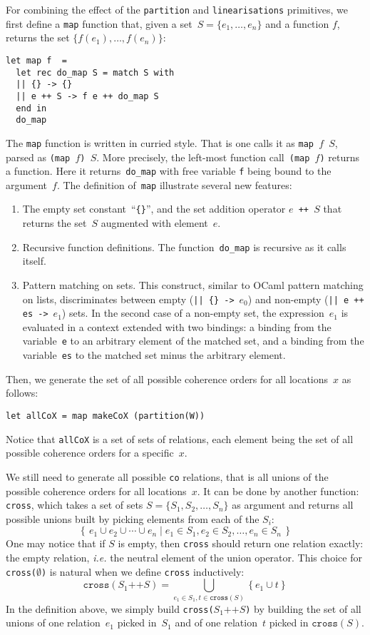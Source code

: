 For combining the effect of the \texttt{partition} and \texttt{linearisations}
primitives, we first define a \texttt{map} function that, given a set~$S=
\{e_1,\ldots,e_n\}$ and a function $f$, returns the set
$\{f(e_1),\ldots,f(e_n)\}$:
\begin{verbatim}
let map f  =
  let rec do_map S = match S with
  || {} -> {}
  || e ++ S -> f e ++ do_map S
  end in
  do_map
\end{verbatim}
The \texttt{map} function is written in curried style.
That is one calls it as \texttt{map~$f$~$S$}, parsed
as \texttt{(map~$f$)~$S$}. More precisely, the left-most function
call~\texttt{(map~$f$)} returns a function.
Here it returns~\texttt{do\_map} with free variable \texttt{f} being bound
to the argument~$f$.
The definition of~\texttt{map} illustrate several new features:
\begin{enumerate}
\item The empty set constant~``\verb+{}+'',
and the set addition operator \texttt{$e$ ++ $S$} that returns the set~$S$
augmented with element~$e$.
\item Recursive function definitions. The function~\verb+do_map+
is recursive as it calls itself.
\item Pattern matching on sets.
This construct, similar to OCaml pattern matching on lists, discriminates
between empty (\verb+|| {} ->+~$e_0$) and non-empty
(\verb!|| e ++ es ->!~$e_1$) sets.
In the second case of a non-empty set, the expression~$e_1$ is evaluated
in a context extended with two bindings: a binding from the variable~\texttt{e}
to an arbitrary element of the matched set, and a binding from
the variable~\texttt{es} to the matched set minus the arbitrary element.
\end{enumerate}

Then, we generate the set of all possible coherence orders
for all locations~$x$ as follows:
\begin{verbatim}
let allCoX = map makeCoX (partition(W))
\end{verbatim}
Notice that \texttt{allCoX} is a set of sets of relations,
each element being the set of all possible coherence orders
for a specific~$x$.

We still need to generate all possible \texttt{co} relations,
that is all unions of the possible coherence orders for
all locations~$x$.  It can be done by another \cat{} function:
\texttt{cross}, which takes a set of sets $S = \{S_1, S_2, \ldots, S_n\}$ as
argument and returns all possible unions built by picking elements from each of
the $S_i$:
$$
\left\{\, e_1 \cup e_2 \cup \cdots \cup e_n \mid
e_1 \in S_1, e_2 \in S_2, \ldots, e_n \in S_n \,\right\}
$$
One may notice that if $S$ is empty, then \texttt{cross} should
return one relation exactly: the empty relation, \emph{i.e.} the neutral
element of the union operator.
This choice for \texttt{cross($\emptyset$)} is natural
when we define \texttt{cross} inductively:
$$
\texttt{cross}(S_1 \mathop{\texttt{++}} S) =
\bigcup_{e_1 \in S_1, t \in \texttt{cross}(S)} \left\{ e_1 \cup t \right\}
$$
In the definition above, we simply build
\texttt{cross($S_1 \mathop{\texttt{++}} S$)} by building the set
of all unions of one relation~$e_1$ picked in~$S_1$
and of one relation~$t$ picked in $\texttt{cross}(S)$.

